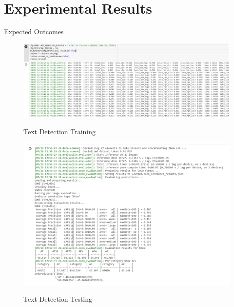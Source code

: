 \documentclass{beamer}
\begin{document}
\section{Experimental Results}
\begin{frame}[allowframebreaks]{Expected Outcomes}

	\begin{figure}
				{\includegraphics[scale=.3]{Detection_Training_Result}}
				\caption{Text Detection Training}
				\label{Detection_Training_Result}
	\end{figure}

	\begin{figure}
				{\includegraphics[scale=.3]{Detection_Testing_Result}}
				\caption{Text Detection Testing}
				\label{Detection_Testing_Result}
	\end{figure}


\end{frame}
\end{document}
